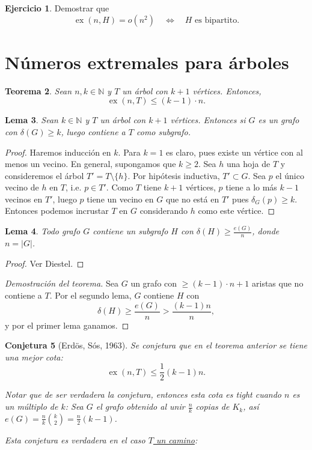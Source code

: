 \documentclass[12pt]{report}
\theoremstyle{plain}
\newtheorem{theorem}{Teorema}[section]
\newtheorem{lemma}[theorem]{Lema}
\newtheorem{conjecture}[theorem]{Conjetura}
\theoremstyle{definition}
\newtheorem{exercise}[theorem]{Ejercicio}
\newcommand{\naturals}{\mathbb{N}}
\newcommand{\abs}[1]{\left \vert #1 \right \vert}
\newcommand{\ex}[2]{\operatorname{ex} (#1, #2)}
\begin{document}
\begin{exercise}
Demostrar que
\[
    \ex n H = o (n^2) \quad \Leftrightarrow \quad H \text{ es bipartito}.
\]
\end{exercise}



\section{Números extremales para árboles}



\begin{theorem}
Sean $n,k \in \naturals$ y $T$ un árbol con $k+1$ vértices. Entonces,
\[
    \ex n T \leq (k-1) \cdot n.
\]
\end{theorem}

\begin{lemma}
Sean $k \in \naturals$ y $T$ un árbol con $k+1$ vértices. Entonces si $G$ es un grafo con $\delta (G) \geq k$, luego contiene a $T$ como subgrafo.
\end{lemma}
\begin{proof}
Haremos inducción en $k$. Para $k = 1$ es claro, pues existe un vértice con al menos un vecino. En general, supongamos que $k \geq 2$. Sea $h$ una hoja de $T$ y consideremos el árbol $T' = T \setminus \{h\}$. Por hipótesis inductiva, $T' \subset G$. Sea $p$ el único vecino de $h$ en $T$, i.e. $p \in T'$. Como $T$ tiene $k+1$ vértices, $p$ tiene a lo más $k-1$ vecinos en $T'$, luego $p$ tiene un vecino en $G$ que no está en $T'$ pues $\delta_G (p) \geq k$. Entonces podemos incrustar $T$ en $G$ considerando $h$ como este vértice.
\end{proof}

\begin{lemma}
Todo grafo $G$ contiene un subgrafo $H$ con $\delta (H) \geq \frac{e(G)}{n}$, donde $n = \abs G$.
\end{lemma}
\begin{proof}
Ver Diestel.
\end{proof}

\begin{proof}[Demostración del teorema]
Sea $G$ un grafo con $\geq (k-1) \cdot n + 1$ aristas que no contiene a $T$. Por el segundo lema, $G$ contiene $H$ con
\[
    \delta (H) \geq \frac{e(G)}{n} > \frac{(k-1) n}{n},
\]
y por el primer lema ganamos.
\end{proof}

\begin{conjecture}[Erdös, Sós, 1963]
Se conjetura que en el teorema anterior se tiene una mejor cota:
\[
    \ex n T \leq \frac 1 2 (k-1) n.
\]

Notar que de ser verdadera la conjetura, entonces esta cota es tight cuando $n$ es un múltiplo de $k$: Sea $G$ el grafo obtenido al unir $\frac n k$ copias de $K_k$, así $e(G) = \frac n k \binom k 2 = \frac n 2 (k-1)$.

Esta conjetura es verdadera en el caso \underline{$T$ un camino}:
\end{conjecture}
\end{document}
